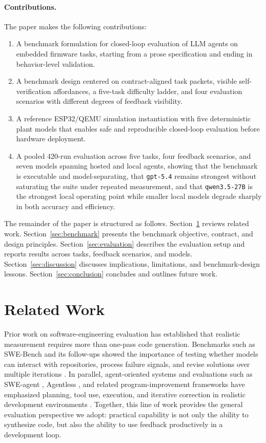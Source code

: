\documentclass[a4paper,fleqn]{cas-dc}
\DeclareRobustCommand{\tool}[1]{\texttt{\nolinkurl{#1}}}
\begin{document}
\paragraph{Contributions.}
The paper makes the following contributions:
\begin{enumerate}
    \item A benchmark formulation for closed-loop evaluation of LLM agents on embedded firmware tasks, starting from a prose specification and ending in behavior-level validation.
    \item A benchmark design centered on contract-aligned task packets, visible self-verification affordances, a five-task difficulty ladder, and four evaluation scenarios with different degrees of feedback visibility.
    \item A reference ESP32/QEMU simulation instantiation with five deterministic plant models that enables safe and reproducible closed-loop evaluation before hardware deployment.
    \item A pooled 420-run evaluation across five tasks, four feedback scenarios, and seven models spanning hosted and local agents, showing that the benchmark is executable and model-separating, that \tool{gpt-5.4} remains strongest without saturating the suite under repeated measurement, and that \tool{qwen3.5-27B} is the strongest local operating point while smaller local models degrade sharply in both accuracy and efficiency.
\end{enumerate}

The remainder of the paper is structured as follows. Section~\ref{sec:related} reviews related work. Section~\ref{sec:benchmark} presents the benchmark objective, contract, and design principles. Section~\ref{sec:evaluation} describes the evaluation setup and reports results across tasks, feedback scenarios, and models. Section~\ref{sec:discussion} discusses implications, limitations, and benchmark-design lessons. Section~\ref{sec:conclusion} concludes and outlines future work.

\section{Related Work}
\label{sec:related}

Prior work on software-engineering evaluation has established that realistic measurement requires more than one-pass code generation. Benchmarks such as SWE-Bench and its follow-ups showed the importance of testing whether models can interact with repositories, process failure signals, and revise solutions over multiple iterations \cite{swebench, swebench_verified}. In parallel, agent-oriented systems and evaluations such as SWE-agent \cite{sweagent}, Agentless \cite{code_agent_eval}, and related program-improvement frameworks have emphasized planning, tool use, execution, and iterative correction in realistic development environments \cite{autocode_agents}. Together, this line of work provides the general evaluation perspective we adopt: practical capability is not only the ability to synthesize code, but also the ability to use feedback productively in a development loop.
\end{document}
